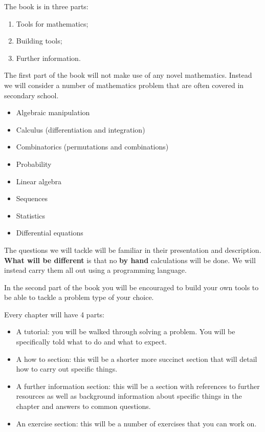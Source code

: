 The book is in three parts:
\begin{enumerate}
\item Tools for mathematics;
\item Building tools;
\item Further information.

\end{enumerate}

The first part of the book will not make use of any novel mathematics.
Instead we will consider a number of mathematics problem that are often covered
in secondary school.

\begin{itemize}
    \item Algebraic manipulation
    \item Calculus (differentiation and integration)
    \item Combinatorics (permutations and combinations)
    \item Probability
    \item Linear algebra
    \item Sequences
    \item Statistics
    \item Differential equations
\end{itemize}

The questions we will tackle will be familiar in their presentation and
description. \textbf{What will be different} is that no \textbf{by hand} calculations will
be done. We will instead carry them all out using a programming language.

In the second part of the book you will be encouraged to build your own tools
to be able to tackle a problem type of your choice.

Every chapter will have 4 parts:

\begin{itemize}
\item A tutorial: you will be walked through solving a problem. You will be
specifically told what to do and what to expect.

\item A how to section: this will be a shorter more succinct section that will
detail how to carry out specific things.

\item 
A further information section: this will be a section with references to
further resources as well as background information about specific things in
the chapter and answers to common questions.

\item
An exercise section: this will be a number of exercises that you can work on.

\end{itemize}


